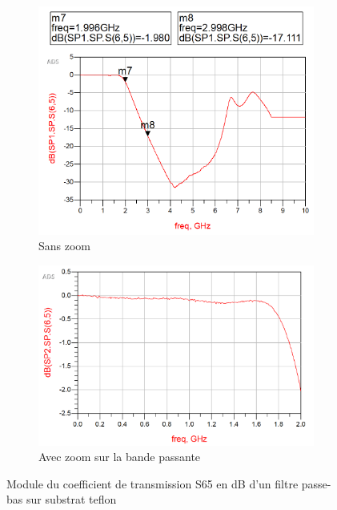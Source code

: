 \documentclass[french]{article}
\begin{document}
\begin{figure}[H]
	\centering
	\begin{subfigure}[b]{0.49\textwidth}
		\includegraphics[width=\textwidth]{photo/passe_bas_vic/simu_passe_bas_reel_tche_teflon.PNG}
		\caption{Sans zoom}
		\label{fig:simu_passe_bas_reel_tche_teflon}
	\end{subfigure}
	\begin{subfigure}[b]{0.49\textwidth}
		\includegraphics[width=\textwidth]{photo/passe_bas_vic/simu_zoom_passe_bas_reel_tche_teflon.PNG}
		\caption{Avec zoom sur la bande passante}
		\label{fig:simu_zoom_passe_bas_reel_tche_teflon}
	\end{subfigure}
	\caption{Module du coefficient de transmission S65 en dB d'un filtre passe-bas sur substrat teflon}
\end{figure}
\end{document}

